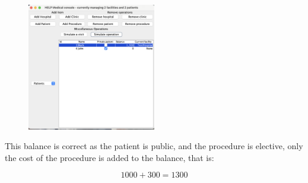 \documentclass{article}
\begin{document}
\begin{figure}
  \begin{center}
    \includegraphics[width=0.5\textwidth]{./figures/Operation/Operation_6.png}
  \end{center}
\end{figure}

This balance is correct as the patient is public, and the procedure is elective, only the cost of the procedure is added to the balance, that is: 

\[
  1000 + 300 = 1300
\]
\end{document}

